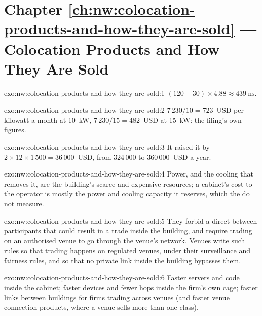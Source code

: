 \section*{Chapter \ref{ch:nw:colocation-products-and-how-they-are-sold} --- Colocation Products and How They Are Sold}

\begin{solution}{exo:nw:colocation-products-and-how-they-are-sold:1}
$(120 - 30) \times 4.88 \approx \qty{439}{\nano\second}$.
\end{solution}

\begin{solution}{exo:nw:colocation-products-and-how-they-are-sold:2}
$7\,230/10 = 723$~USD per kilowatt a month at \qty{10}{\kilo\watt}, $7\,230/15 = 482$~USD at \qty{15}{\kilo\watt}: the filing's own figures.
\end{solution}

\begin{solution}{exo:nw:colocation-products-and-how-they-are-sold:3}
It raised it by $2 \times 12 \times 1\,500 = 36\,000$~USD, from 324\,000 to 360\,000~USD a year.
\end{solution}

\begin{solution}{exo:nw:colocation-products-and-how-they-are-sold:4}
Power, and the cooling that removes it, are the building's scarce and expensive resources; a cabinet's cost to the operator is mostly the power
and cooling capacity it reserves, which the  do not measure.
\end{solution}

\begin{solution}{exo:nw:colocation-products-and-how-they-are-sold:5}
They forbid a direct  between participants that could result in a trade inside the building, and require trading on an authorised
venue to go through the venue's network. Venues write such rules so that trading happens on regulated venues, under their surveillance and
fairness rules, and so that no private link inside the building bypasses them.
\end{solution}

\begin{solution}{exo:nw:colocation-products-and-how-they-are-sold:6}
Faster servers and code inside the cabinet; faster devices and fewer hops inside the firm's own cage; faster links between buildings for
firms trading across venues (and faster venue connection products, where a venue sells more than one class).
\end{solution}

